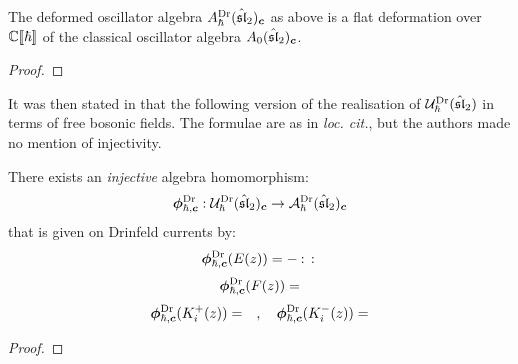         \begin{proposition} \label{prop: q_deformed_affine_sl_2_oscillator_algebra_drinfeld_current_presentation_PBW}
            The deformed oscillator algebra $A_{\hbar}^{\mathrm{Dr}}(\hat{\mathfrak{sl}}_2)_{\boldsymbol{c}}$ as above is a flat deformation over $\mathbb{C}[\![\hbar]\!]$ of the classical oscillator algebra $A_0(\hat{\mathfrak{sl}}_2)_{\boldsymbol{c}}$.
        \end{proposition}
            \begin{proof}
                
            \end{proof}
            
        It was then stated in \cite[Proposition 4]{frenkel_reshetikhin_affine_QUEs_and_deformed_virasoro_and_finite_W_algebras} that the following version of the realisation of $\mathcal{U}_{\hbar}^{\mathrm{Dr}}(\hat{\mathfrak{sl}}_2)$ in terms of free bosonic fields. The formulae are as in \textit{loc. cit.}, but the authors made no mention of injectivity. 
        \begin{proposition} \label{prop: free_boson_realisation_quantum_affine_sl_2_drinfeld_current_presentation}
            There exists an \textit{injective} algebra homomorphism:
                \begin{equation} \label{equation: free_boson_realisation_quantum_affine_sl_2_drinfeld_current_presentation}
                    \boldsymbol{\phi}^{\mathrm{Dr}}_{\hbar, \boldsymbol{c}}: \mathcal{U}_{\hbar}^{\mathrm{Dr}}(\hat{\mathfrak{sl}}_2)_{\boldsymbol{c}} \to \mathcal{A}_{\hbar}^{\mathrm{Dr}}(\hat{\mathfrak{sl}}_2)_{\boldsymbol{c}}
                \end{equation}
            that is given on Drinfeld currents by:
                \begin{equation}
                    \boldsymbol{\phi}^{\mathrm{Dr}}_{\hbar, \boldsymbol{c}}( E(z) ) = -\: \mathbf{:} \: {  }  \: \mathbf{:} \:
                \end{equation}
                \begin{equation}
                    \boldsymbol{\phi}^{\mathrm{Dr}}_{\hbar, \boldsymbol{c}}( F(z) ) =
                \end{equation}
                \begin{equation}
                    \boldsymbol{\phi}^{\mathrm{Dr}}_{\hbar, \boldsymbol{c}}( K_i^+(z) ) = \quad, \quad \boldsymbol{\phi}^{\mathrm{Dr}}_{\hbar, \boldsymbol{c}}( K_i^-(z) ) =
                \end{equation}
        \end{proposition}
            \begin{proof}
                
            \end{proof}

